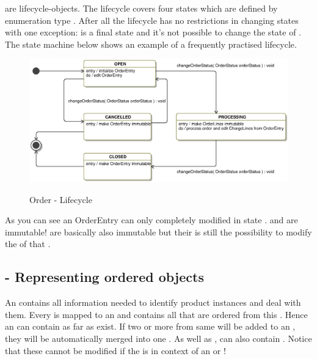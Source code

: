  are lifecycle-objects. The lifecycle covers four states which are defined by enumeration type . After all the lifecycle has no restrictions in changing states with one exception:  is a final state and it's not possible to change the state of  . The state machine below shows an example of a frequently practised lifecycle.

\begin{figure}[ht]
	\centering
  \includegraphics[scale =.7]{images/OrderEntryState.eps}
	\label{order_statemachine}
	\caption{Order - Lifecycle}
\end{figure}  

As you can see an OrderEntry can only completely modified in state .  and   are immutable!   are basically also immutable but their is still the possibility to modify the  of that . 

\subsection{ - Representing ordered objects}
An  contains all information needed to identify product instances and deal with them. Every  is mapped to an  and contains all  that are ordered from this . Hence an  can contain as far  as  exist. If two or more  from same  will be added to an , they will be automatically merged into one .
As well as ,  can also contain . Notice that these  cannot be modified if the  is in context of an  or  ! 

